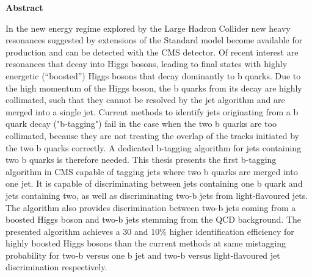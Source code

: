 \newpage
\thispagestyle{empty}
\vspace*{2.0cm}


\begin{center}
{\bf Abstract}
\end{center}

In the new energy regime explored by the Large Hadron Collider new heavy resonances suggested by extensions of the Standard model become available for production and can be detected with the CMS detector. Of recent interest are resonances that decay into Higgs bosons, leading to final states with highly energetic (``boosted'') Higgs bosons that decay dominantly to b quarks. Due to the high momentum of the Higgs boson, the b quarks from its decay are highly collimated, such that they cannot be resolved by the jet algorithm and are merged into a single jet. Current methods to
identify jets originating from a b quark decay ("b-tagging") fail in the case when the two b quarks are too collimated, because they are not treating the overlap of the tracks initiated by the two b quarks correctly. A dedicated
b-tagging algorithm for jets containing two b quarks is therefore needed. This thesis presents the first b-tagging algorithm in CMS capable of tagging jets where two b quarks are merged into one jet. It is capable of discriminating between jets containing one b quark and jets containing two, as well as discriminating two-b jets from light-flavoured jets. The algorithm also provides discrimination between two-b jets coming from a boosted Higgs boson and two-b jets stemming from the QCD background. The presented algorithm achieves a 30 and 10\% higher identification efficiency for highly boosted Higgs bosons than the current methods at same mistagging probability for two-b versus one b jet and two-b versus light-flavoured jet discrimination respectively.

\cleardoublepage






























































